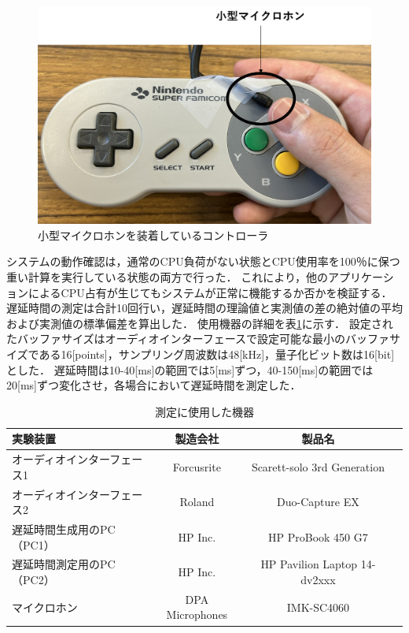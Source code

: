 \begin{figure}[bt]
  \centering
  \includegraphics[scale=0.35]{figures/DelayCheck/SuperFamicom_delayCheck.pdf}
  \caption{小型マイクロホンを装着しているコントローラ}
  \label{fig:super_famicom}
\end{figure}
システムの動作確認は，通常のCPU負荷がない状態とCPU使用率を100％に保つ重い計算を実行している状態の両方で行った．
これにより，他のアプリケーションによるCPU占有が生じてもシステムが正常に機能するか否かを検証する．
遅延時間の測定は合計10回行い，遅延時間の理論値と実測値の差の絶対値の平均および実測値の標準偏差を算出した．
使用機器の詳細を表\ref{table:device_delay_check}に示す．
設定されたバッファサイズはオーディオインターフェースで設定可能な最小のバッファサイズである16[points]，サンプリング周波数は48[kHz]，量子化ビット数は16[bit]とした．
遅延時間は10-40[ms]の範囲では5[ms]ずつ，40-150[ms]の範囲では20[ms]ずつ変化させ，各場合において遅延時間を測定した．
\begin{table}[tbp]
  \caption{測定に使用した機器}
  \label{table:device_delay_check}
  \centering
  \begin{tabular}{lccc}
    \hline
    実験装置 & 製造会社 & 製品名\\
    \hline \hline
    オーディオインターフェース1  & Forcusrite & Scarett-solo 3rd Generation\\
    オーディオインターフェース2  & Roland & Duo-Capture EX\\
    遅延時間生成用のPC（PC1）  & HP Inc. & HP ProBook 450 G7\\
    遅延時間測定用のPC（PC2）  & HP Inc. & HP Pavilion Laptop 14-dv2xxx\\
    マイクロホン  & DPA Microphones & IMK-SC4060
\\
    \hline
  \end{tabular}
\end{table}

